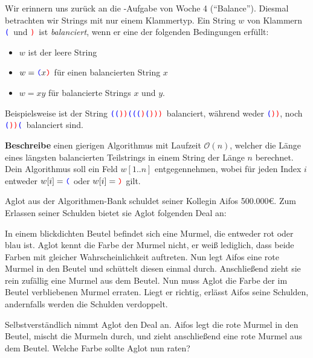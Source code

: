 \documentclass{uebung_cs}
\begin{document}
\begin{aufgabe}[Balance]
    \newcommand{\obr}{\textcolor{blue}{\texttt (}}
    \newcommand{\cbr}{\textcolor{red}{\texttt )}}
    Wir erinnern uns zurück an die -Aufgabe von Woche 4 (``Balance'').
    Diesmal betrachten wir Strings mit nur einem Klammertyp.
    Ein String $w$ von Klammern \obr\ und \cbr\ ist \emph{balanciert}, wenn er eine der folgenden Bedingungen erfüllt:
    \begin{itemize}
        \item $w$ ist der leere String
        \item $w = \obr x \cbr$ für einen balancierten String $x$
        \item $w = xy$ für balancierte Strings $x$ und $y$.
    \end{itemize}
    Beispielsweise ist der String \obr \obr \cbr \cbr \obr \obr \obr \cbr \obr \cbr \cbr \cbr\ balanciert, während weder \obr \cbr \cbr, noch \obr \cbr \cbr \obr\ balanciert sind.

    \textbf{Beschreibe} einen gierigen Algorithmus mit Laufzeit $\mathcal O(n)$, welcher die Länge eines längsten balancierten Teilstrings in einem String der Länge $n$ berechnet.
    Dein Algorithmus soll ein Feld $w[1..n]$ entgegennehmen, wobei für jeden Index $i$ entweder $w[i] = \obr$ oder $w[i] = \cbr$ gilt.
\end{aufgabe}

\begin{aufgabe}[Schuldenerlass]
    Aglot aus der Algorithmen-Bank schuldet seiner Kollegin Aifos 500.000€. Zum Erlassen seiner Schulden bietet sie Aglot folgenden Deal an:

    In einem blickdichten Beutel befindet sich eine Murmel, die entweder rot oder blau ist.
    Aglot kennt die Farbe der Murmel nicht, er weiß lediglich, dass beide Farben mit gleicher Wahrscheinlichkeit auftreten.
    Nun legt Aifos eine rote Murmel in den Beutel und schüttelt diesen einmal durch.
    Anschließend zieht sie rein zufällig eine Murmel aus dem Beutel.
    Nun muss Aglot die Farbe der im Beutel verbliebenen Murmel erraten.
    Liegt er richtig, erlässt Aifos seine Schulden, andernfalls werden die Schulden verdoppelt.

    Selbstverständlich nimmt Aglot den Deal an.
    Aifos legt die rote Murmel in den Beutel, mischt die Murmeln durch, und zieht anschließend eine rote Murmel aus dem Beutel.
    Welche Farbe sollte Aglot nun raten?
\end{aufgabe}
\end{document}
